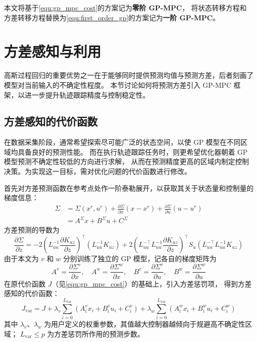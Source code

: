 本文将基于\autoref{equ:gp_mpc_cost}的方案记为\textbf{零阶 GP-MPC}，
将状态转移方程和方差转移方程替换为\autoref{equ:first_order_gp}的方案记为\textbf{一阶 GP-MPC}。

\section{方差感知与利用}
\label{sec:variance_aware}

高斯过程回归的重要优势之一在于能够同时提供预测均值与预测方差，后者刻画了模型对当前输入的不确定性程度。
本节讨论如何将预测方差引入 GP-MPC 框架，以进一步提升轨迹跟踪精度与控制稳定性。

\subsection{方差感知的代价函数}

在数据采集阶段，通常希望探索尽可能广泛的状态空间，以使 GP 模型在不同区域均具备良好的预测性能。
而在执行轨迹跟踪任务时，则更希望优化器朝着 GP 模型预测不确定性较低的方向进行求解，
从而在预测精度更高的区域内制定控制决策。为实现这一目标，需对优化问题的代价函数进行修改。

首先对方差预测函数在参考点处作一阶泰勒展开，以获取其关于状态量和控制量的梯度信息：
\begin{equation}
    \begin{aligned}
        \Sigma &= \Sigma(x^r, u^r) + \frac{\partial \Sigma}{\partial x} (x - x^r) 
        + \frac{\partial \Sigma}{\partial u} (u - u^r) \\
        &= A^{\Sigma} x + B^{\Sigma} u + C^{\Sigma}
    \end{aligned}
\end{equation}
方差预测的导数为
\begin{equation}
    \frac{\partial \Sigma}{\partial z} = -2 (L_{u u}^{-1} \frac{\partial K_{u z}}{\partial z})^\top (L_{u u}^{-1} K_{u z})
    +2(L_{u u}^{-\top} L_{u u}^{-1} \frac{\partial K_{u z}}{\partial z})^\top S_u (L_{u u}^{-\top} L_{u u}^{-1} K_{u z})
\end{equation}
由于本文为 $v$ 和 $w$ 分别训练了独立的 GP 模型，记各自的梯度矩阵为
\begin{equation}
    A^v = \frac{\partial \Sigma^v}{\partial x},\quad 
    A^w = \frac{\partial \Sigma^w}{\partial x},\quad
    B^v = \frac{\partial \Sigma^v}{\partial u},\quad 
    B^w = \frac{\partial \Sigma^w}{\partial u}
\end{equation}
在原代价函数 $J$（见\autoref{equ:gp_mpc_cost}）的基础上，引入方差惩罚项，
得到方差感知的代价函数：
\begin{equation}
    J_{\mathrm{var}} = J 
    + \lambda_v \sum_{i=0}^{L_{\mathrm{var}}} \!\left(A^v_i x_i + B^v_i u_i + C^v_i\right) 
    + \lambda_w \sum_{i=0}^{L_{\mathrm{var}}} \!\left(A^w_i x_i + B^w_i u_i + C^w_i\right)
\end{equation}
其中 $\lambda_v$、$\lambda_w$ 为用户定义的权重参数，其值越大控制器越倾向于规避高不确定性区域；
$L_{\mathrm{var}} \leq p$ 为方差惩罚所作用的预测步数。

